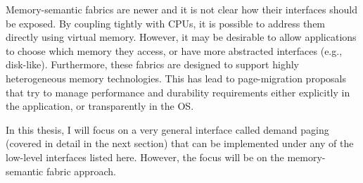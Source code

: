Memory-semantic fabrics are newer and it is not clear how their interfaces
should be exposed. By coupling tightly with CPUs, it is possible to address
them directly using virtual memory. However, it may be desirable to allow
applications to choose which memory they access, or have more abstracted
interfaces (e.g., disk-like). Furthermore, these fabrics are designed to support highly heterogeneous memory technologies. This has lead to page-migration proposals that try to manage performance and durability requirements either explicitly in the application, or transparently in the OS\cite{heteros}\cite{mojim}.

In this thesis, I will focus on a very general interface called demand paging
(covered in detail in the next section) that can be implemented under any of
the low-level interfaces listed here. However, the focus will be on the
memory-semantic fabric approach.

